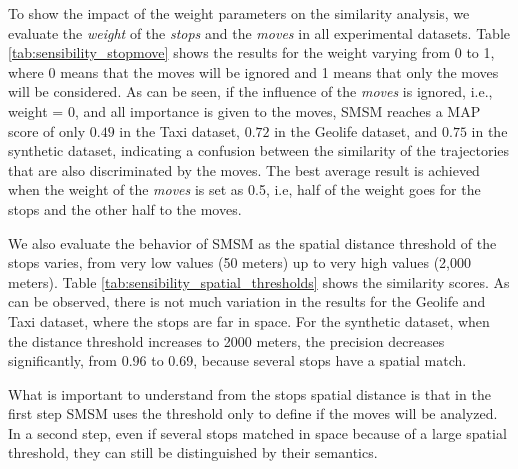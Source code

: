 {To show the impact of the weight parameters on the similarity analysis, we evaluate the \emph{weight} of the \emph{stops} and the \emph{moves} in all experimental datasets. Table {\ref{tab:sensibility_stopmove}} shows the results for the weight varying from 0 to 1, where 0 means that the moves will be ignored and 1 means that only the moves will be considered.  As can be seen, if the influence of the \emph{moves} is ignored, i.e., weight = 0, and all importance is given to the moves, SMSM reaches a MAP score of only $0.49$ in the Taxi dataset, $0.72$ in the Geolife dataset, and $0.75$ in the synthetic dataset, indicating a confusion between the similarity of the trajectories that are also discriminated by the moves. The best average result is achieved when the weight of the \emph{moves} is set as 0.5, i.e, half of the weight goes for the stops and the other half to the moves.}

\begin{table}[ht!]
  \scriptsize
  \centering
  \caption{Impact of the weights over the moves in trajectory similarity}
  \label{tab:sensibility_stopmove}
\end{table}

{We also evaluate the behavior of SMSM as the spatial distance threshold of the stops varies, from very low values (50 meters) up to very high values (2,000 meters). Table {\ref{tab:sensibility_spatial_thresholds}} shows the similarity scores. As can be observed, there is not much variation in the results for the Geolife and Taxi dataset, where the stops are far in space. For the synthetic dataset, when the distance threshold increases to 2000 meters, the precision decreases significantly, from 0.96 to 0.69, because several stops have a spatial match.}

{What is important to understand from the stops spatial distance is that in the first step SMSM uses the threshold only to define if the moves will be analyzed. In a second step, even if several stops matched in space because of a large spatial threshold, they can still be distinguished by their semantics.}



